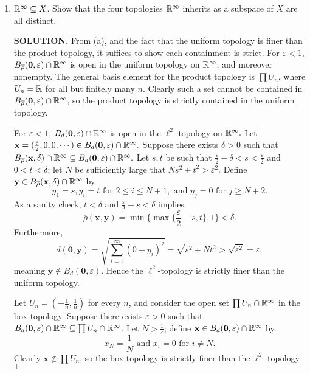 \documentclass{article}
\begin{document}
\begin{enumerate}
\begin{enumerate}
        \item $\mathbb{R}^\infty \subseteq X$. Show that the four topologies $\mathbb{R}^\infty$ inherits as a subspace of $X$ are all distinct.

        {\bf SOLUTION.} From (a), and the fact that the uniform topology is finer than the product topology, it suffices to show each containment is strict. For $\varepsilon < 1$, $B_{\overline{\rho}}(\mathbf{0}, \varepsilon) \cap \mathbb{R}^\infty$ is open in the uniform topology on $\mathbb{R}^\infty$, and moreover nonempty. The general basis element for the product topology is $\prod U_n$, where $U_n = \mathbb{R}$ for all but finitely many $n$. Clearly such a set cannot be contained in $B_{\overline{\rho}}(\mathbf{0}, \varepsilon) \cap \mathbb{R}^\infty$, so the product topology is strictly contained in the uniform topology.

        For $\varepsilon < 1$, $B_d(\mathbf{0}, \varepsilon) \cap \mathbb{R}^\infty$ is open in the $\ell^2$-topology on $\mathbb{R}^\infty.$ Let $\mathbf{x} = (\frac{\varepsilon}{2}, 0, 0, \cdots) \in B_d(\mathbf{0}, \varepsilon) \cap \mathbb{R}^\infty.$ Suppose there exists $\delta > 0$ such that $B_{\overline{\rho}}(\mathbf{x}, \delta) \cap \mathbb{R}^\infty \subseteq B_d(\mathbf{0}, \varepsilon) \cap \mathbb{R}^\infty.$ Let $s, t$ be such that $\frac{\varepsilon}{2} - \delta < s < \frac{\varepsilon}{2}$ and $0 < t < \delta$; let $N$ be sufficiently large that $Ns^2 + t^2 > \varepsilon^2.$ Define $\mathbf{y} \in B_{\overline{\rho}}(\mathbf{x}, \delta) \cap \mathbb{R}^\infty$ by
        $$y_1 = s, y_i = t \text{ for } 2 \leq i \leq N+1, \text{ and } y_j = 0 \text{ for } j \geq N+2.$$
        As a sanity check, $t < \delta$ and $\frac{\varepsilon}{2} - s < \delta$ implies
        $$\overline{\rho}(\mathbf{x}, \mathbf{y}) = \min\{\max \{ \frac{\varepsilon}{2} - s, t \}, 1\} < \delta.$$
        Furthermore,
        $$d(\mathbf{0}, \mathbf{y}) = \sqrt{\sum_{i=1}^\infty (0 - y_i)^2} = \sqrt{s^2 + Nt^2} > \sqrt{\varepsilon^2} = \varepsilon,$$
        meaning $\mathbf{y} \notin B_d(\mathbf{0}, \varepsilon)$. Hence the $\ell^2$-topology is strictly finer than the uniform topology.

        Let $U_n = (-\frac1n, \frac1n)$ for every $n$, and consider the open set $\prod U_n \cap \mathbb{R}^\infty$ in the box topology. Suppose there exists $\varepsilon > 0$ such that $B_d(\mathbf{0}, \varepsilon) \cap \mathbb{R}^\infty \subseteq \prod U_n \cap \mathbb{R}^\infty$. Let $N > \frac{1}{\varepsilon}$; define $\mathbf{x} \in B_d(\mathbf{0}, \varepsilon) \cap \mathbb{R}^\infty$ by 
        $$x_N = \frac1N \text{ and } x_i = 0 \text{ for } i \neq N.$$
        Clearly $\mathbf{x} \notin \prod U_n$, so the box topology is strictly finer than the $\ell^2$-topology. $\Box$


\end{enumerate}
\end{enumerate}
\end{document}
